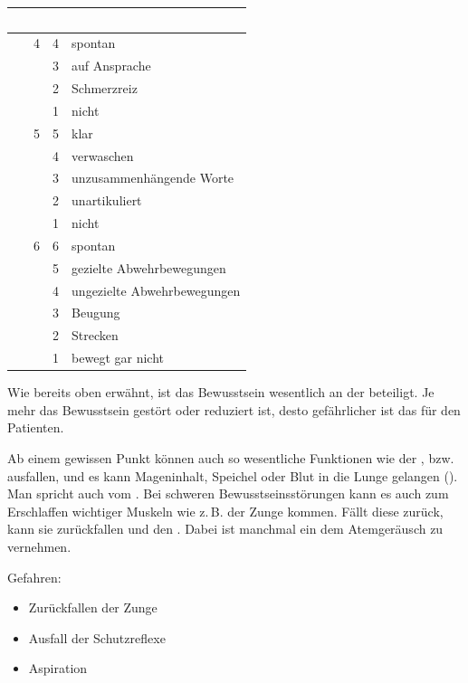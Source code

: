 \begin{table}[H]
\begin{WidePar}
\TableBaseModification
{}

\begin{tabulary}{\linewidth}{LCCL}\addlinespace\toprule\addlinespace
\noindent ~ & \noindent{} & \noindent{} &
\noindent{}
\\\midrule
\noindent{} & 4 & 4 & spontan
\\
 & & 3 & auf Ansprache
\\
 & & 2 & Schmerzreiz
\\
 & & 1 & nicht
\\\midrule
\noindent{} & 5 & 5 & klar
\\
 & & 4 & verwaschen
\\
 & & 3 & unzusammenhängende Worte
\\
 & & 2 & unartikuliert
\\
 & & 1 & nicht
\\\midrule
\noindent{} & 6 & 6 & spontan
\\
 & & 5 & gezielte Abwehrbewegungen
\\
 & & 4 & ungezielte Abwehrbewegungen
\\
 & & 3 & Beugung
\\
 & & 2 & Strecken
\\
 & & 1  & bewegt gar nicht
\\\bottomrule
\end{tabulary}
\end{WidePar}
\end{table}


{%
\label{topic:bewusstseinsstoerung}%
Wie bereits oben erwähnt, ist das Bewusstsein wesentlich an
der  beteiligt. Je mehr das
Bewusstsein gestört oder reduziert ist, desto gefährlicher ist das für
den Patienten. 

Ab einem gewissen Punkt können auch so wesentliche
Funktionen wie der ,  bzw. 
ausfallen, und es kann Mageninhalt, Speichel oder Blut in
die Lunge gelangen (). Man spricht auch vom
.
Bei schweren Bewusstseinsstörungen kann es auch zum Erschlaffen
wichtiger Muskeln wie z.\,B. der Zunge kommen. Fällt
diese zurück, kann sie zurückfallen und den .
Dabei ist manchmal ein dem 
Atemgeräusch zu vernehmen.
}{%
Gefahren:
\begin{itemize}
  \item Zurückfallen der Zunge
  \item Ausfall der Schutzreflexe
  \item Aspiration
\end{itemize}
}{}{}{}

